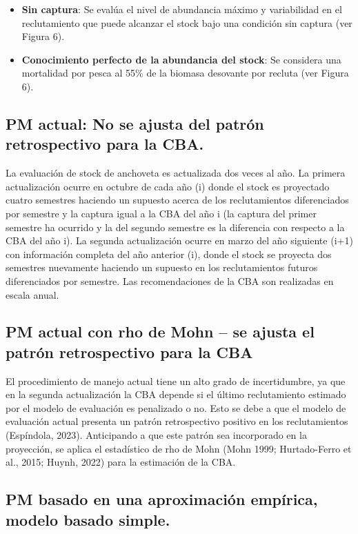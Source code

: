 \begin{itemize}
    \item \textbf{Sin captura}: Se evalúa el nivel de abundancia máximo y variabilidad en el reclutamiento que puede alcanzar el stock bajo una condición sin captura (ver Figura 6). 
    \item \textbf{Conocimiento perfecto de la abundancia del stock}: Se considera una mortalidad por pesca al 55\% de la biomasa desovante por recluta (ver Figura 6). 
\end{itemize}


\subsection{PM actual: No se ajusta del patrón retrospectivo para la CBA.}

La evaluación de stock de anchoveta es actualizada dos veces al año. La primera actualización ocurre en octubre de cada año (i) donde el stock es proyectado cuatro semestres haciendo un supuesto acerca de los reclutamientos diferenciados por semestre y la captura igual a la CBA del año i (la captura del primer semestre ha ocurrido y la del segundo semestre es la diferencia con respecto a la CBA del año i). La segunda actualización ocurre en marzo del año siguiente (i+1) con información completa del año anterior (i), donde el stock se proyecta dos semestres nuevamente haciendo un supuesto en los reclutamientos futuros diferenciados por semestre. Las recomendaciones de la CBA son realizadas en escala anual.

\subsection{PM actual con rho de Mohn – se ajusta el patrón retrospectivo para la CBA}

El procedimiento de manejo actual tiene un alto grado de incertidumbre, ya que en la segunda actualización la CBA depende si el último reclutamiento estimado por el modelo de evaluación es penalizado o no. Esto se debe a que el modelo de evaluación actual presenta un patrón retrospectivo positivo en los reclutamientos (Espíndola, 2023). Anticipando a que este patrón sea incorporado en la proyección, se aplica el estadístico de rho de Mohn (Mohn 1999; Hurtado-Ferro et al., 2015; Huynh, 2022) para la estimación de la CBA.

\subsection{PM basado en una aproximación empírica, modelo basado simple.}

